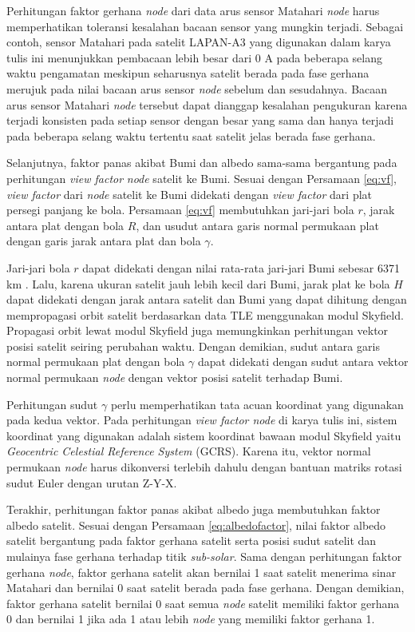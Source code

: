 Perhitungan faktor gerhana \textit{node} dari data arus sensor Matahari
\textit{node} harus memperhatikan toleransi kesalahan bacaan sensor yang
mungkin terjadi. Sebagai contoh, sensor Matahari pada satelit LAPAN-A3 yang
digunakan dalam karya tulis ini menunjukkan pembacaan lebih besar dari 0 A pada
beberapa selang waktu pengamatan meskipun seharusnya satelit berada pada fase
gerhana merujuk pada nilai bacaan arus sensor \textit{node} sebelum dan
sesudahnya. Bacaan arus sensor Matahari \textit{node} tersebut dapat dianggap
kesalahan pengukuran karena terjadi konsisten pada setiap sensor dengan besar
yang sama dan hanya terjadi pada beberapa selang waktu tertentu saat satelit
jelas berada fase gerhana. 

Selanjutnya, faktor panas akibat Bumi dan albedo sama-sama bergantung pada
perhitungan \textit{view factor} \textit{node} satelit ke Bumi. Sesuai dengan
Persamaan \ref{eq:vf}, \textit{view factor} dari \textit{node} satelit ke Bumi
didekati dengan \textit{view factor} dari plat persegi panjang ke bola. Persamaan \ref{eq:vf} membutuhkan jari-jari bola $r$, jarak antara plat dengan bola $R$, dan usudut antara garis normal permukaan plat dengan garis jarak antara plat dan bola $\gamma$. 

Jari-jari bola $r$ dapat didekati dengan nilai rata-rata jari-jari Bumi sebesar
6371 km \cite{moritz}. Lalu, karena ukuran satelit jauh lebih kecil dari Bumi,
jarak plat ke bola $H$ dapat didekati dengan jarak antara satelit dan Bumi yang
dapat dihitung dengan mempropagasi orbit satelit berdasarkan data TLE
menggunakan modul Skyfield. Propagasi orbit lewat modul Skyfield juga
memungkinkan perhitungan vektor posisi satelit seiring perubahan waktu. Dengan
demikian, sudut antara garis normal permukaan plat dengan bola $\gamma$ dapat
didekati dengan sudut antara vektor normal permukaan \textit{node} dengan
vektor posisi satelit terhadap Bumi. 

Perhitungan sudut $\gamma$ perlu memperhatikan tata acuan koordinat yang
digunakan pada kedua vektor. Pada perhitungan \textit{view factor node} di
karya tulis ini, sistem koordinat yang digunakan adalah sistem koordinat bawaan
modul Skyfield yaitu \textit{Geocentric Celestial Reference System} (GCRS).
Karena itu, vektor normal permukaan \textit{node} harus dikonversi terlebih
dahulu dengan bantuan matriks rotasi sudut Euler dengan urutan Z-Y-X.

Terakhir, perhitungan faktor panas akibat albedo juga membutuhkan faktor albedo
satelit. Sesuai dengan Persamaan \ref{eq:albedofactor}, nilai faktor albedo
satelit bergantung pada faktor gerhana satelit serta posisi sudut satelit dan
mulainya fase gerhana terhadap titik \textit{sub-solar}. Sama dengan perhitungan faktor gerhana \textit{node},
faktor gerhana satelit akan bernilai 1 saat satelit menerima sinar Matahari dan
bernilai 0 saat satelit berada pada fase gerhana. Dengan demikian, faktor
gerhana satelit bernilai 0 saat semua \textit{node} satelit memiliki faktor
gerhana 0 dan bernilai 1 jika ada 1 atau lebih \textit{node} yang memiliki faktor gerhana 1.

